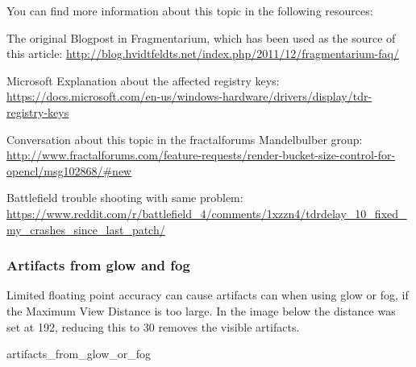You can find more information about this topic in the following resources:

The original Blogpost in Fragmentarium, which has been used as the source of this article: \url{http://blog.hvidtfeldts.net/index.php/2011/12/fragmentarium-faq/}

Microsoft Explanation about the affected registry keys: \url{https://docs.microsoft.com/en-us/windows-hardware/drivers/display/tdr-registry-keys}

Conversation about this topic in the fractalforums Mandelbulber group:
\url{http://www.fractalforums.com/feature-requests/render-bucket-size-control-for-opencl/msg102868/#new}

Battlefield trouble shooting with same problem:
\url{https://www.reddit.com/r/battlefield_4/comments/1xzzn4/tdrdelay_10_fixed_my_crashes_since_last_patch/}

\subsubsection{Artifacts from glow and fog}

 Limited floating point accuracy can cause artifacts can when using glow or fog, if the Maximum View Distance is too large. In the image below the distance was set at 192, reducing this to 30 removes the visible artifacts.
 
 		{artifacts_from_glow_or_fog}
 
 